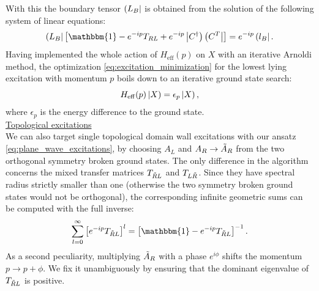 With this the boundary tensor $\left( L_B \right|$ is obtained from the solution of the following system of linear equations:
\begin{equation}
	\tbra{L_B} \left[ \mathbbm{1} - e^{-ip} T_{RL} + e^{-ip} \tket{C^{\dagger}}\tbra{C^T} \right] = e^{-ip} \tbra{l_B}.
\end{equation}
\noindent Having implemented the whole action of $H_{\mathrm{eff}}(p)$ on $X$ with an iterative Arnoldi method, the optimization \eqref{eq:excitation_minimization} for the lowest lying excitation with momentum $p$ boils down to an iterative ground state search:
\begin{equation} \label{eq:ground_state_H_eff_p}
	H_{\mathrm{eff}}(p) \left| X \right) = \epsilon_p \left| X \right),
\end{equation}
where $\epsilon_p$ is the energy difference to the ground state. \\[1em]

\noindent \underline{Topological excitations} \\[0.5em]
\noindent We can also target single topological domain wall excitations with our ansatz \eqref{eq:plane_wave_excitations}, by choosing $A_L$ and $A_R \rightarrow \Tilde{A}_R$ from the two orthogonal symmetry broken ground states. The only difference in the algorithm concerns the mixed transfer matrices $T_{\Tilde{R}L}$ and $T_{L\Tilde{R}}$. Since they have spectral radius strictly smaller than one (otherwise the two symmetry broken ground states would not be orthogonal), the corresponding infinite geometric sums can be computed with the full inverse:
\begin{equation}
	\sum_{l=0}^{\infty} \left[ e^{-ip} T_{\Tilde{R}L} \right]^l  = \left[ \mathbbm{1} - e^{-ip} T_{\Tilde{R}L} \right]^{-1}.
\end{equation}
As a second peculiarity, multiplying $\Tilde{A}_R$ with a phase $e^{i \phi}$ shifts the momentum $p \rightarrow p + \phi$. We fix it unambiguously by ensuring that the dominant eigenvalue of $T_{\Tilde{R}L}$ is positive. \\[1em]

